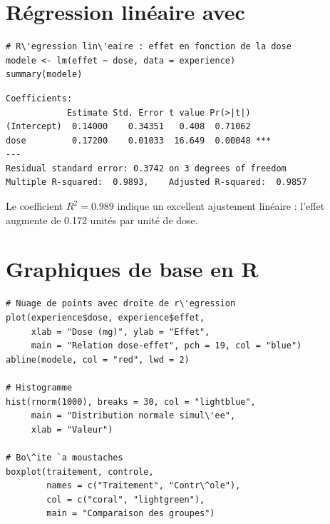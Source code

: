 \section{R\'egression lin\'eaire avec }

\begin{codeblock}[title=\textbf{R}]
\begin{verbatim}
# R\'egression lin\'eaire : effet en fonction de la dose
modele <- lm(effet ~ dose, data = experience)
summary(modele)
\end{verbatim}
\end{codeblock}

\begin{codeoutput}
\begin{verbatim}
Coefficients:
            Estimate Std. Error t value Pr(>|t|)
(Intercept)  0.14000    0.34351   0.408  0.71062
dose         0.17200    0.01033  16.649  0.00048 ***
---
Residual standard error: 0.3742 on 3 degrees of freedom
Multiple R-squared:  0.9893,	Adjusted R-squared:  0.9857
\end{verbatim}
\end{codeoutput}

Le coefficient $R^2 = 0.989$ indique un excellent ajustement lin\'eaire :
l'effet augmente de 0.172 unit\'es par unit\'e de dose.

\section{Graphiques de base en R}

\begin{codeblock}[title=\textbf{R}]
\begin{verbatim}
# Nuage de points avec droite de r\'egression
plot(experience$dose, experience$effet,
     xlab = "Dose (mg)", ylab = "Effet",
     main = "Relation dose-effet", pch = 19, col = "blue")
abline(modele, col = "red", lwd = 2)

# Histogramme
hist(rnorm(1000), breaks = 30, col = "lightblue",
     main = "Distribution normale simul\'ee",
     xlab = "Valeur")

# Bo\^ite `a moustaches
boxplot(traitement, controle,
        names = c("Traitement", "Contr\^ole"),
        col = c("coral", "lightgreen"),
        main = "Comparaison des groupes")
\end{verbatim}
\end{codeblock}

